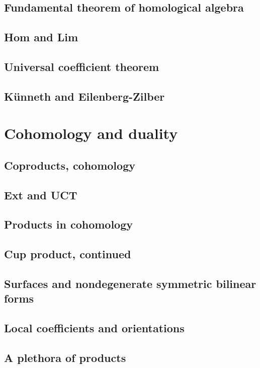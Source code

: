 \documentclass[oneside]{amsbook}
\numberwithin{ex}{section}
\begin{document}
\section{Fundamental theorem of homological algebra}

\section{Hom and Lim}

\section{Universal coefficient theorem}

\section{Künneth and Eilenberg-Zilber}


\chapter{Cohomology and duality}
\section{Coproducts, cohomology}

\section{Ext and UCT}

\section{Products in cohomology}

\section{Cup product, continued}

\section{Surfaces and nondegenerate symmetric bilinear forms}

\section{Local coefficients and orientations}

\setcounter{section}{32}
\section{A plethora of products}

\end{document}
